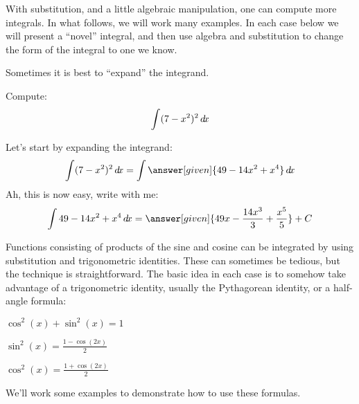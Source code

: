 \documentclass{ximera}
\begin{document}
With substitution, and a little algebraic manipulation, one can
compute more integrals. In what follows, we will work many examples.
In each case below we will present a ``novel'' integral, and then use
algebra and substitution to change the form of the integral to one
we know.

Sometimes it is best to ``expand'' the integrand.

\begin{example}
  Compute:
  \[
  \int (7-x^2)^2 \mathop{}\!d\! x
  \]
  \begin{explanation}
    Let's start by expanding the integrand:
    \[
    \int (7-x^2)^2 \d x  = \int \answer[given]{49 - 14x^2 + x^4} \d x
    \]
    Ah, this is now easy, write with me:
    \[
    \int 49 - 14x^2 + x^4 \d x = \answer[given]{49x - \frac{14 x^3}{3} + \frac{x^5}{5}} + C
    \]
  \end{explanation}
\end{example}

Functions consisting of products of the sine and cosine can be
integrated by using substitution and trigonometric identities. These
can sometimes be tedious, but the technique is straightforward. The
basic idea in each case is to somehow take advantage of a
trigonometric identity, usually the Pythagorean identity, or a
half-angle formula:
\begin{description}
\item[Pythagorean Identity] $\cos^2(x) + \sin^2(x) = 1$
\item[Half-Angle Formula] $\sin^2(x) = \frac{1-\cos(2x)}{2}$
\item[Half-Angle Formula] $\cos^2(x)= \frac{1+\cos(2x)}{2}$
\end{description}

We'll work some examples to demonstrate how to use these formulas.
\end{document}
